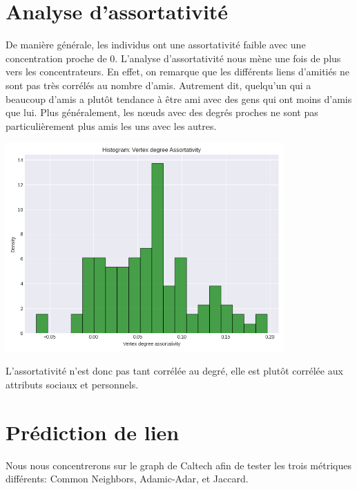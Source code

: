 \documentclass{article}
\begin{document}
\section{Analyse d'assortativité}

De manière générale, les individus ont une assortativité faible avec une concentration proche de $0$.
L'analyse d'assortativité nous mène une fois de plus vers les concentrateurs. En effet, on remarque que les différents liens d'amitiés ne sont pas très corrélés au nombre d'amis.
Autrement dit, quelqu'un qui a beaucoup d'amis a plutôt tendance à être ami avec des gens qui ont moins d'amis que lui.
Plus généralement, les nœuds avec des degrés proches ne sont pas particulièrement plus amis les uns avec les autres.

\hfill\includegraphics[width=0.8\textwidth]{assets/histogram_assortativity_degree.png}\hfill

L'assortativité n'est donc pas tant corrélée au degré, elle est plutôt corrélée aux attributs sociaux et personnels.

\section{Prédiction de lien}


Nous nous concentrerons sur le graph de Caltech afin de tester les trois métriques différents: Common Neighbors, Adamic-Adar, et Jaccard.
\end{document}

